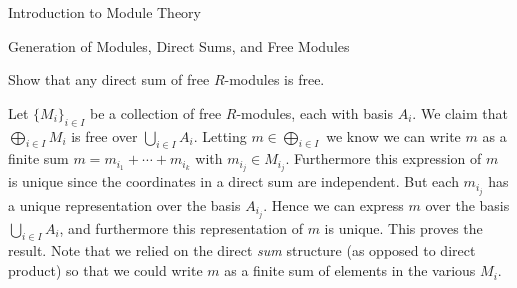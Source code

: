 \begin{chapter}{Introduction to Module Theory}
\begin{section}{Generation of Modules, Direct Sums, and Free Modules}
\begin{problem}\label{ex:10.3.23}
Show that any direct sum of free $R$-modules is free.
\end{problem}
\begin{solution}Let $\{M_i\}_{i\in I}$ be a collection of free $R$-modules, each with basis $A_i$. We claim that $\bigoplus_{i\in I} M_i$ is free over $\bigcup_{i\in I} A_i$. Letting $m\in \bigoplus_{i\in I}$ we know we can write $m$ as a finite sum $m = m_{i_1} + \cdots + m_{i_k}$ with $m_{i_j}\in M_{i_j}$. Furthermore this expression of $m$ is unique since the coordinates in a direct sum are independent. But each $m_{i_j}$ has a unique representation over the basis $A_{i_j}$. Hence we can express $m$ over the basis $\bigcup_{i\in I} A_i$, and furthermore this representation of $m$ is unique. This proves the result. Note that we relied on the direct \emph{sum} structure (as opposed to direct product) so that we could write $m$ as a finite sum of elements in the various $M_i$. 

\end{solution}\oneperpage




\end{section}
\end{chapter}
